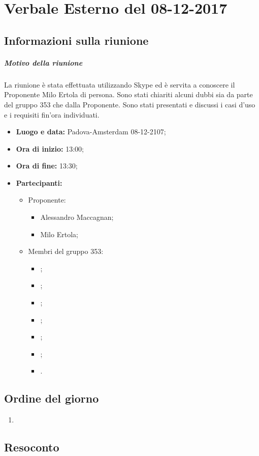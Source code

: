 \documentclass[RaccoltaVerbali.tex]{subfiles}
\begin{document}
\chapter{Verbale Esterno del 08-12-2017}
\section{Informazioni sulla riunione}
\paragraph{Motivo della riunione}
La riunione è stata effettuata utilizzando Skype ed è servita a conoscere il Proponente Milo Ertola di persona. Sono stati chiariti alcuni dubbi sia da parte del gruppo 353 che dalla Proponente. Sono stati presentati e discussi i casi d'uso e i requisiti fin'ora individuati.
\begin{itemize}
	\item \textbf{Luogo e data:} Padova-Amsterdam 08-12-2107;
	\item \textbf{Ora di inizio:} 13:00;
	\item \textbf{Ora di fine:} 13:30;
	\item \textbf{Partecipanti:}
	\begin{itemize}
		\item Proponente:
		\begin{itemize}
			\item Alessandro Maccagnan;
			\item Milo Ertola;
		\end{itemize}
		\item Membri del gruppo 353:
		\begin{itemize}
			\item \Davide;
			\item \Elena;
			\item \Gianluca;
			\item \Mirco;
			\item \Parwinder;
			\item \Riccardo;
			\item \Valentina.
		\end{itemize}

	\end{itemize}
\end{itemize}
\section{Ordine del giorno}	
\begin{enumerate}
	\item 
\end{enumerate}
\section{Resoconto}
\end{document}
